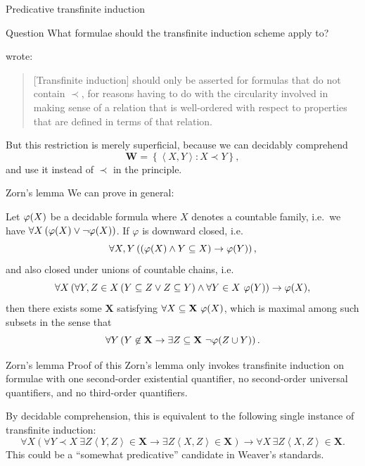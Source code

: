 \documentclass{beamer}
\newcommand{\tuple}[1]{\left\langle #1 \right\rangle}
\begin{document}
\begin{frame}{Predicative transfinite induction}
  \begin{block}{Question}
    What formulae should the transfinite induction scheme apply to?
  \end{block}

   wrote:
  \begin{quotation}
    [Transfinite induction] should only be asserted for formulas that do not contain $\prec$, for reasons having to do with the circularity involved in making sense of a relation that is well-ordered with respect to properties that are defined in terms of that relation.
  \end{quotation}

  \vspace{0.6em}

  But this restriction is merely superficial, because we can decidably comprehend
  \[\mathbf{W} = \left\{\tuple{X, Y} : X \prec Y\right\},\]
  and use it instead of $\prec$ in the principle.
\end{frame}

\begin{frame}{Zorn's lemma}
  We can prove in general:
  \begin{theorem}
    Let $\varphi\mleft(X\mright)$ be a decidable formula where $X$ denotes a countable family, i.e.\ we have $\forall X \left(\varphi\mleft(X\mright) \lor \neg \varphi\mleft(X\mright)\right)$. If $\varphi$ is downward closed, i.e.
    \[\forall X, Y \left(\left(\varphi\mleft(X\mright) \land Y \subseteq X\right) \rightarrow \varphi\mleft(Y\mright)\right),\]
    and also closed under unions of countable chains, i.e.
    \[\forall X \left(\forall Y, Z \in X \left(Y \subseteq Z \lor Z \subseteq Y\right) \land \forall Y \in X \ \varphi\mleft(Y\mright)\right) \rightarrow \varphi\mleft(X\mright),\]
    then there exists some $\mathbf{X}$ satisfying $\forall X \subseteq \mathbf{X} \ \varphi\mleft(X\mright)$, which is maximal among such subsets in the sense that
    \[\forall Y \left(Y \not\in \mathbf{X} \rightarrow \exists Z \subseteq \mathbf{X} \ \neg \varphi\mleft(Z \cup {Y}\mright)\right).\]
  \end{theorem}
\end{frame}

\begin{frame}{Zorn's lemma}
  Proof of this Zorn's lemma only invokes transfinite induction on formulae with one second-order existential quantifier, no second-order universal quantifiers, and no third-order quantifiers.

  \vspace{0.6em}

  By decidable comprehension, this is equivalent to the following single instance of transfinite induction:
  \[\forall X \left(\forall Y \prec X \ \exists Z \tuple{Y, Z} \in \mathbf{X} \rightarrow \exists Z \tuple{X, Z} \in \mathbf{X}\right) \rightarrow \forall X \, \exists Z \tuple{X, Z} \in \mathbf{X}.\]
  This could be a ``somewhat predicative'' candidate in Weaver's standards.
\end{frame}
\end{document}
